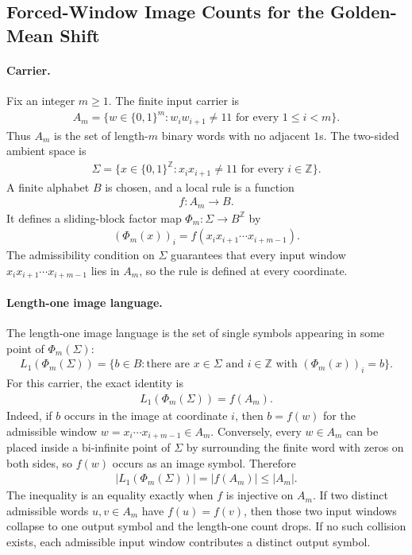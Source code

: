 
\subsection{Forced-Window Image Counts for the Golden-Mean Shift}
\label{sec:phi-m-factor-image-language-count-decipherability}

\paragraph{Carrier.}
Fix an integer $m \geq 1$. The finite input carrier is
$$
\begin{aligned}
A_m = \{ w \in \{0,1\}^m : w_i w_{i+1} \neq 11 \text{ for every } 1 \leq i < m \}.
\end{aligned}
$$
Thus $A_m$ is the set of length-$m$ binary words with no adjacent $1$s. The two-sided ambient space is
$$
\begin{aligned}
\Sigma = \{ x \in \{0,1\}^{\mathbb{Z}} : x_i x_{i+1} \neq 11 \text{ for every } i \in \mathbb{Z} \}.
\end{aligned}
$$
A finite alphabet $B$ is chosen, and a local rule is a function
$$
\begin{aligned}
f : A_m \longrightarrow B.
\end{aligned}
$$
It defines a sliding-block factor map $\Phi_m : \Sigma \to B^{\mathbb{Z}}$ by
$$
\begin{aligned}
(\Phi_m(x))_i = f(x_i x_{i+1} \cdots x_{i+m-1}).
\end{aligned}
$$
The admissibility condition on $\Sigma$ guarantees that every input window $x_i x_{i+1} \cdots x_{i+m-1}$ lies in $A_m$, so the rule is defined at every coordinate.

\paragraph{Length-one image language.}
The length-one image language is the set of single symbols appearing in some point of $\Phi_m(\Sigma)$:
$$
\begin{aligned}
L_1(\Phi_m(\Sigma)) = \{ b \in B : \text{there are } x \in \Sigma \text{ and } i \in \mathbb{Z} \text{ with } (\Phi_m(x))_i=b \}.
\end{aligned}
$$
For this carrier, the exact identity is
$$
\begin{aligned}
L_1(\Phi_m(\Sigma)) = f(A_m).
\end{aligned}
$$
Indeed, if $b$ occurs in the image at coordinate $i$, then $b=f(w)$ for the admissible window $w=x_i\cdots x_{i+m-1}\in A_m$. Conversely, every $w\in A_m$ can be placed inside a bi-infinite point of $\Sigma$ by surrounding the finite word with zeros on both sides, so $f(w)$ occurs as an image symbol. Therefore
$$
\begin{aligned}
|L_1(\Phi_m(\Sigma))| = |f(A_m)| \leq |A_m|.
\end{aligned}
$$
The inequality is an equality exactly when $f$ is injective on $A_m$. If two distinct admissible words $u,v\in A_m$ have $f(u)=f(v)$, then those two input windows collapse to one output symbol and the length-one count drops. If no such collision exists, each admissible input window contributes a distinct output symbol.

